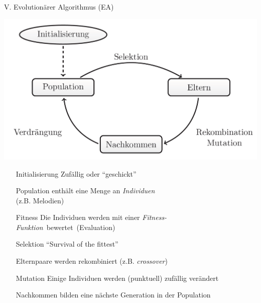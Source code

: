 \begin{frame}{V. \dimFiveTitle}{Evolutionärer Algorithmus (EA)}
	\begin{multicols}{2}
		\hspace{-1cm}
		\includegraphics[width=.5\textwidth]{img/EvoAlg_Scheme.png}
		
		\columnbreak
		\begin{itemize}
			\item[Initialisierung] Zufällig oder \enquote{geschickt}
			\item[Population] enthält eine Menge an \emph{Individuen}\\
													\hfill(z.B. Melodien)
			\item[Fitness] Die Individuen werden mit einer \mbox{\emph{Fitness-Funktion} bewertet (Evaluation)}
			\item[Selektion] \enquote{Survival of the fittest}
			\item[Elternpaare] werden rekombiniert (z.B. \emph{crossover})
			\item[Mutation] Einige Individuen werden (punktuell) zufällig verändert 
			\item[Nachkommen] bilden eine nächste Generation in der Population
		\end{itemize}
	\end{multicols}
\end{frame}

